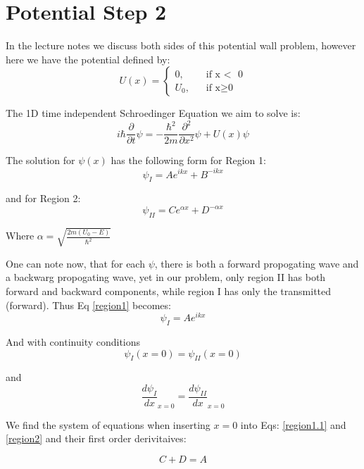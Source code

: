 \documentclass{article}
\begin{document}
\section{Potential Step 2 }

In the lecture notes we discuss both sides of this potential wall problem, however here we have the potential defined by:
\[
U(x) =
  \begin{cases}
    \text{0,} &\quad\text{if x $<$ }\text{0} \\
    \text{$U_0$,} &\quad\text{if x}\ge\text{0}
  \end{cases}
\]

The 1D time independent Schroedinger Equation we aim to solve is:
\begin{equation}
i \hbar \frac{\partial}{\partial t }\psi = -\frac{\hbar^2}{2m} \frac{\partial^2}{\partial x^2} \psi + U(x) \psi
\label{schro}
\end{equation}

The solution for $\psi (x)$ has the following form for Region 1:
\begin{equation}
\psi_{I} = A e^{ikx} + B^{-ikx}
\label{region1}
\end{equation}

and for Region 2:
\begin{equation}
\psi_{II} = C e^{\alpha x} + D^{-\alpha x}
\label{region2}
\end{equation}

Where $\alpha = \sqrt{\frac{2m(U_0 - E)}{\hbar^2}}$

One can note now, that for each $\psi$, there is both a forward propogating wave and a backwarg propogating wave, yet in our problem, only region II has both forward and backward components, while region I has only the transmitted (forward).
Thus Eq \ref{region1} becomes:
\begin{equation}
\psi_I = Ae^{ikx}
\label{region1.1}
\end{equation}

And with continuity conditions
$$\psi_I(x=0) = \psi_{II}(x=0)$$

and
$$\frac{d \psi_I}{dx}_{x=0} =\frac{d \psi_{II}}{dx}_{x=0}  $$

We find the system of equations when inserting $x = 0$ into Eqs: \ref{region1.1} and \ref{region2} and their first order derivitaives:

\begin{equation}
C + D = A
\label{condition1}
\end{equation}
\end{document}
